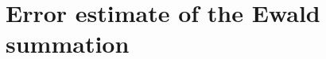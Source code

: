\documentclass[aps,pre,preprint]{revtex4-1}
\begin{document}






\newpage
\appendix
\section{Error estimate of the Ewald summation}




\newpage

{}

\end{document}
